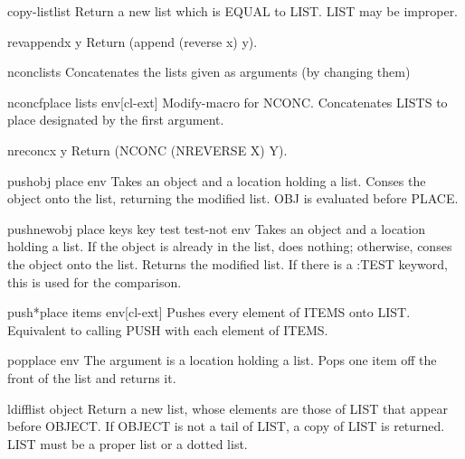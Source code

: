 \documentclass[10pt,english]{book}
\begin{document}
\begin{function}{copy-list}{list}
  Return a new list which is EQUAL to LIST. LIST may be improper.
\end{function}

\begin{function}{revappend}{x y}
  Return (append (reverse x) y).
\end{function}

\begin{function}{nconc}{\rest lists}
  Concatenates the lists given as arguments (by changing them)
\end{function}

\begin{macro}{nconcf}{place \rest lists \env env}[cl-ext]
  Modify-macro for NCONC. Concatenates LISTS to place designated by the first
argument.
\end{macro}

\begin{function}{nreconc}{x y}
  Return (NCONC (NREVERSE X) Y).
\end{function}

\begin{macro}{push}{obj place \env env}
  Takes an object and a location holding a list. Conses the object onto
  the list, returning the modified list. OBJ is evaluated before PLACE.
\end{macro}

\begin{macro}{pushnew}{obj place \rest keys \key key test test-not \env env}
  Takes an object and a location holding a list. If the object is
  already in the list, does nothing; otherwise, conses the object onto
  the list. Returns the modified list. If there is a :TEST keyword, this
  is used for the comparison.
\end{macro}

\begin{macro}{push*}{place \rest items \env env}[cl-ext]
  Pushes every element of ITEMS onto LIST. Equivalent to calling PUSH
  with each element of ITEMS.
\end{macro}

\begin{macro}{pop}{place \env env}
  The argument is a location holding a list. Pops one item off the front
  of the list and returns it.
\end{macro}

\begin{function}{ldiff}{list object}
  Return a new list, whose elements are those of LIST that appear before
   OBJECT. If OBJECT is not a tail of LIST, a copy of LIST is returned.
   LIST must be a proper list or a dotted list.
\end{function}
\end{document}
